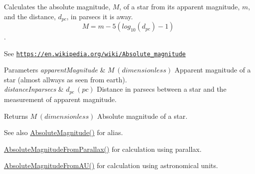 Calculates the absolute magnitude, $M$, of a star from its apparent magnitude, $m$, and the distance, $d_{pc}$, in parsecs it is away. \[M= m - 5 \left ( log_{10}(d_{pc}) - 1 \right )\]. 

See \href{https://en.wikipedia.org/wiki/Absolute_magnitude}{\tt https\+://en.\+wikipedia.\+org/wiki/\+Absolute\+\_\+magnitude}


\begin{DoxyParams}{Parameters}
{\em apparent\+Magnitude} & $M\ (dimensionless)$ Apparent magnitude of a star (almost allways as seen from earth). \\
\hline
{\em distance\+Inparsecs} & $d_{pc}\ (pc)$ Distance in parsecs between a star and the measurement of apparent magnitude. \\
\hline
\end{DoxyParams}
\begin{DoxyReturn}{Returns}
$M\ (dimensionless)$ Absolute magnitude of a star. 
\end{DoxyReturn}
\begin{DoxySeeAlso}{See also}
\mbox{\hyperlink{group___e_g_x_phys-_astrophysics-_absolute_magnitude_ga2ddb255fa28972334d82f377ce182048}{Absolute\+Magnitude()}} for alias. 

\mbox{\hyperlink{group___e_g_x_phys-_astrophysics-_absolute_magnitude_ga057faec7c22e76e31ad65bf2f98e0d58}{Absolute\+Magnitude\+From\+Parallax()}} for calculation using parallax. 

\mbox{\hyperlink{group___e_g_x_phys-_astrophysics-_absolute_magnitude_gab25029a422f98bc7f8cea59abce3860e}{Absolute\+Magnitude\+From\+A\+U()}} for calculation using astronomical units. 
\end{DoxySeeAlso}
